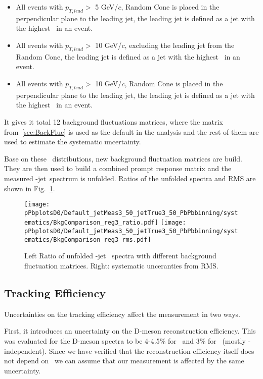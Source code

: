 \begin{itemize}
\item All events with $p_{T, lead}>$ 5 GeV/$c$, Random Cone is placed in the perpendicular plane to the leading jet, the leading jet is defined as a jet with the highest \pt\ in an event.
\item All events with $p_{T, lead}>$ 10 GeV/$c$, excluding the leading jet from the Random Cone, the leading jet is defined as a jet with the highest \pt\ in an event. 
\item All events with $p_{T, lead}>$ 10 GeV/$c$, Random Cone is placed in the perpendicular plane to the leading jet, the leading jet is defined as a jet with the highest \pt\ in an event.
\end{itemize}
It gives it total 12 background fluctuations matrices, where the matrix from~\ref{sec:BackFluc} is used as the default in the analysis and the rest of them are used to estimate the systematic uncertainty. 




Base on these \deltapt\ distributions, new background fluctuation matrices are build. They are then used to build a combined prompt response matrix and the measured \Dzero-jet\ \pt spectrum is unfolded. Ratios of the unfolded spectra and RMS are shown in Fig.~\ref{fig:PbPb_BkgFlucSys_Dzero}.

\begin{figure}[bth]
\centering
\texttt{[image: pPbplotsD0/Default\_jetMeas3\_50\_jetTrue3\_50\_PbPbbinning/systematics/BkgComparison\_reg3\_ratio.pdf]}
\texttt{[image: pPbplotsD0/Default\_jetMeas3\_50\_jetTrue3\_50\_PbPbbinning/systematics/BkgComparison\_reg3\_rms.pdf]}
\caption{ Left Ratio of unfolded \Dzero-jet \pt\ spectra with different background fluctuation matrices. Right: systematic unceranties from RMS.}
\label{fig:PbPb_BkgFlucSys_Dzero}
\end{figure}


\subsection{Tracking Efficiency}
Uncertainties on the tracking efficiency affect the measurement in two ways. 

First, it introduces an uncertainty on the D-meson reconstruction efficiency. This was evaluated for the D-meson spectra to be 4-4.5\% for \Dstar\ and 3\% for \Dzero\ (mostly \pt-independent). Since we have verified that the reconstruction efficiency itself does not depend on \ptchjet\ we can assume that our measurement is affected by the same uncertainty.

